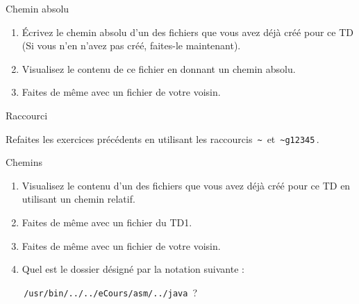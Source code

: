 \documentclass[a4paper,11pt]{article}
\begin{document}
\begin{Tutoriel}{Chemin absolu}
					\textcolor{white}{.} \par

\par

\begin{enumerate}
	
	\item \'Ecrivez le chemin absolu d'un des fichiers que vous
	avez d\'ej\`a cr\'e\'e pour ce TD (Si vous n'en n'avez pas cr\'e\'e, 
	faites-le maintenant).  
	\item Visualisez le contenu de ce fichier en donnant un
	chemin absolu.
	\item Faites de m\^eme avec un fichier de votre voisin.
	
\end{enumerate}	
\end{Tutoriel}

\clearpage

\begin{Tutoriel}{Raccourci}
						\textcolor{white}{.} \par
	
	\par
	
	Refaites les exercices pr\'ec\'edents en utilisant les raccourcis 
	\,\verb|~|\, et \,\verb|~g12345|\,.
	
	\par
\end{Tutoriel}


\begin{Tutoriel}{Chemins}
						\textcolor{white}{.} \par
	
	\par
	
	\begin{enumerate}
		
		\item Visualisez le contenu d'un des fichiers que vous avez d\'ej\`a cr\'e\'e pour ce TD en utilisant un chemin relatif.
		\item Faites de m\^eme avec un fichier du TD1. 
		\item Faites de m\^eme avec un fichier de votre voisin. 
		\item 
		Quel est le dossier d\'esign\'e par la notation suivante : \par
		\,\verb|/usr/bin/../../eCours/asm/../java|\, ?
		
	\end{enumerate}
\end{Tutoriel}
\end{document}
